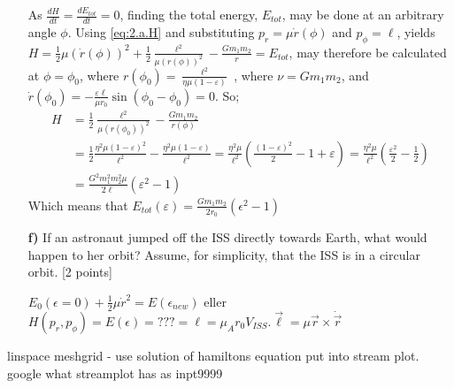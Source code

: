\documentclass[11pt,a4paper]{report}
\newcounter{excount}[chapter]
\newenvironment{exercise}[1][]{\addtocounter{excount}{1} \noindent {\bf Question
    \arabic{excount} \ \ #1}\hspace{2mm}}{\vspace{4mm}}
\begin{document}
\begin{exercise}{\bf Orbital motion\\}
\begin{itemize}
As $\frac{dH}{dt}=\frac{dE_{tot}}{dt}=0$, finding the total energy, $E_{tot}$, may be done at an arbitrary angle $\phi$. Using  \eqref{eq:2.a.H} and substituting  $p_r=\mu \dot{r}(\phi)$ and $p_\phi=\ell$, yields $H=\frac{1}{2}\mu(\dot{r}(\phi))^2+\frac{1}{2}\frac{\ell^2}{\mu (r(\phi))^2}-\frac{Gm_1m_2}{r}=E_{tot}$, may therefore be calculated at $\phi=\phi_0$, where  $r(\phi_0)=\frac{\ell^2}{\eta \mu(1-\varepsilon)}$ , where $\nu=Gm_1m_2$, and $\dot{r}(\phi_0)=-\frac{\varepsilon \ell}{\mu r_0}\sin(\phi_0-\phi_0)=0$. So;
\begin{align*}
	H&=\frac{1}{2}\frac{\ell^2}{\mu (r(\phi_0))^2}-\frac{Gm_1m_2}{r(\phi)} \\
	&=\frac{1}{2}\frac{\eta^2\mu(1-\varepsilon)^2}{\ell^2}-\frac{\eta^2 \mu(1-\varepsilon)}{\ell^2}=\frac{\eta^2 \mu}{\ell^2}\left(\frac{(1-\varepsilon)^2}{2}-1+\varepsilon\right)=\frac{\eta^2 \mu}{\ell^2}(\frac{\varepsilon^2}{2}-\frac{1}{2})\\
	&=\frac{G^2m_1^2m_2^2 \mu}{2\ell}(\varepsilon^2-1)
\end{align*}
Which means that $E_{tot}(\varepsilon)=\frac{Gm_1m_2}{2r_0}(\epsilon^2-1)$



\item[{\bf f)}] If an astronaut jumped off the ISS directly towards Earth, what would happen to her orbit? Assume, for simplicity, that the ISS is in a circular orbit. [2 points] \par
$E_0(\epsilon=0)+\frac{1}{2}\mu \dot{r}^2=E(\epsilon_{new})$ eller $H(p_r,p_\phi)=E(\epsilon)=???=\ell=\mu_A r_0V_{ISS}. \vec{\ell}=\mu\vec{r} \times \dot{\vec{r}}$
\end{itemize}
\end{exercise}


linspace meshgrid - use solution of hamiltons equation put into stream plot. google what streamplot has as inpt9999
\end{document}
